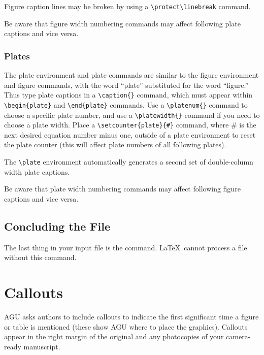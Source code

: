 \begin{article}
Figure caption lines may be broken by using a 
\verb"\protect\linebreak" command.

Be aware that figure width numbering commands may affect 
following plate captions and vice versa.


\subsubsection{Plates}

The plate environment and plate commands are 
similar to the figure environment and figure 
commands, with the word ``plate'' substituted for 
the word ``figure.''  Thus type plate captions in 
a \verb"\caption{}" command, which must appear within 
\verb"\begin{plate}" and %
\verb"\end{plate}" commands.  Use a \verb"\platenum{}" 
command to choose a specific plate number, and use a 
\verb"\platewidth{}" command if you need to choose a 
plate width.  Place a \verb"\setcounter{plate}{#}" 
command, where \# is the next desired equation number 
minus one, outside of a plate environment to reset 
the plate counter (this will affect plate numbers 
of all following plates).

The \verb"\plate" environment automatically generates
a second set of double-column width plate captions.

Be aware that plate width numbering commands may affect 
following figure captions and vice versa.


\subsection{Concluding the File}

The last thing in your input file is the \linebreak
\verb"" command.  \LaTeX\ 
cannot process a file without this command.


\section{Callouts}

AGU asks authors to include callouts to indicate the first 
significant time a figure or table is mentioned (these show 
AGU where to place the graphics).  Callouts appear in the 
right margin of the original and any photocopies of your 
camera-ready manuscript.


\end{article}
